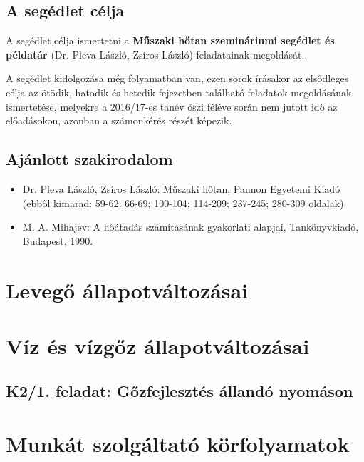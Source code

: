\documentclass[11pt, a4paper]{report}
\begin{document}
\section*{A segédlet célja}

A segédlet célja ismertetni a \textbf{Műszaki hőtan szemináriumi segédlet és példatár} (Dr. Pleva László, Zsíros László) feladatainak megoldását.

A segédlet kidolgozása még folyamatban van, ezen sorok írásakor az elsődleges célja az ötödik, hatodik és hetedik fejezetben található feladatok megoldásának ismertetése, melyekre a 2016/17-es tanév őszi féléve során nem jutott idő az előadásokon, azonban a számonkérés részét képezik.


\section*{Ajánlott szakirodalom}

\begin{itemize}
	\item Dr. Pleva László, Zsíros László: Műszaki hőtan, Pannon Egyetemi Kiadó (ebből kimarad: 59-62; 66-69; 100-104; 114-209; 237-245; 280-309 oldalak)
	\item M. A. Mihajev: A hőátadás számításának gyakorlati alapjai, Tankönyvkiadó, Budapest, 1990.
\end{itemize}


\chapter{Levegő állapotváltozásai}





\chapter{Víz és vízgőz állapotváltozásai}

\section*{K2/1. feladat: Gőzfejlesztés állandó nyomáson}


\chapter{Munkát szolgáltató körfolyamatok}
\end{document}
